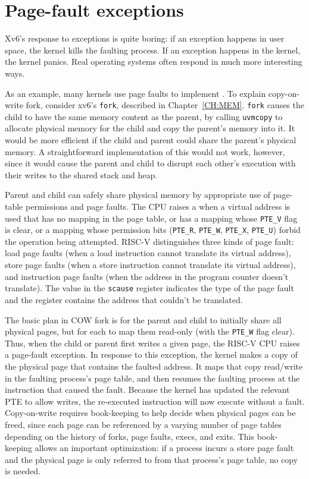 \section{Page-fault exceptions}
\label{sec:pagefaults}

Xv6's response to exceptions is quite boring: if an exception happens
in user space, the kernel kills the faulting process.  If an
exception happens in the kernel, the kernel panics.  Real operating systems
often respond in much more interesting ways.

As an example,
many kernels use page faults to implement
.
To explain copy-on-write fork, consider xv6's \lstinline{fork},
described in Chapter~\ref{CH:MEM}.
\lstinline{fork} causes the child to have the same
memory content as the parent, by calling
\lstinline{uvmcopy}
to allocate physical memory for
the child and copy the parent's memory into it.
It would be more efficient if the child and parent could share 
the parent's physical memory.
A straightforward implementation of this would not work, however,
since it would cause the parent and child to disrupt each other's
execution with their writes to the shared stack and heap.

Parent and child can safely share physical memory by
appropriate use of page-table permissions and page faults.
The CPU raises a
when a virtual address is used that has no mapping
in the page table, or has a mapping whose \lstinline{PTE_V}
flag is clear, or a mapping whose permission bits
(\lstinline{PTE_R},
\lstinline{PTE_W},
\lstinline{PTE_X},
\lstinline{PTE_U})
forbid the operation being attempted.
RISC-V distinguishes three
kinds of page fault: load page faults (when a load instruction cannot
translate its virtual address), store page faults (when a store
instruction cannot translate its virtual address), and instruction
page faults (when the address in the program counter doesn't translate).  The
value in the \lstinline{scause} register indicates the type of the
page fault and the  register contains the address
that couldn't be translated.

The basic plan in COW fork is for the parent and child to initially
share all physical pages, but for each to map them read-only (with the
\lstinline{PTE_W} flag clear). Thus, when the child or parent first
writes a given page,
the RISC-V CPU raises a page-fault exception. In
response to this exception, the kernel makes a copy of the physical
page that contains the faulted address. It maps that copy read/write
in the faulting process's page table, and then resumes the faulting
process at the instruction that caused the fault. Because the kernel
has updated the relevant PTE to allow writes, the re-executed instruction
will now execute without a fault. Copy-on-write requires book-keeping
to help decide when physical pages can be freed, since each page can
be referenced by a varying number of page tables depending on the history of
forks, page faults, execs, and exits. This book-keeping allows
an important optimization: if a process incurs a store page
fault and the physical page is only referred to from that process's
page table, no copy is needed.

